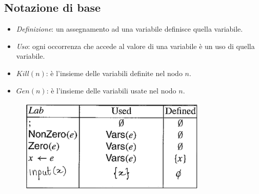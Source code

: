 \documentclass[a4paper,oneside,titlepage]{book}
\begin{document}
\subsection{Notazione di base}
\begin{itemize}
    \item \textit{Definizione}: un assegnamento ad una variabile definisce quella variabile.
    \item \textit{Uso}: ogni occorrenza che accede al valore di una variabile è un uso di quella variabile.
    \item $Kill(n)$: è l'insieme delle variabili definite nel nodo $n$.
    \item $Gen(n)$: è l'insieme delle variabili usate nel nodo $n$.
\end{itemize}
\begin{figure}[htp]
	\centering
	\includegraphics[width=0.8\textwidth]{useDefCfg.png}
\end{figure}
\end{document}
